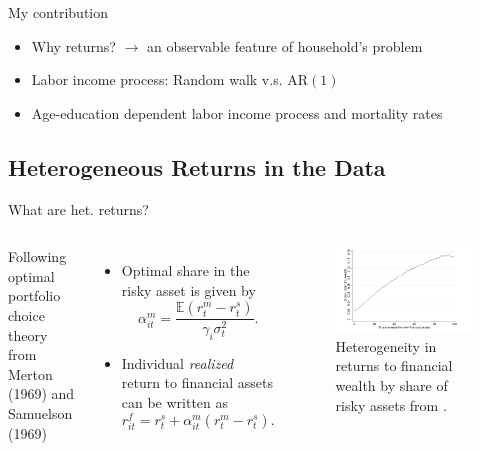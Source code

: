 \documentclass{beamer}
\begin{document}
\begin{frame}{My contribution}


\begin{itemize}
  \item Why returns? $\rightarrow$ an observable feature of household's problem
\item Labor income process: Random walk v.s. AR$(1)$
\item Age-education dependent labor income process and mortality rates
\end{itemize}
\end{frame}

\subsection{Heterogeneous Returns in the Data}
\begin{frame}{What are het. returns?}

   \begin{columns}
     \small
     Following optimal portfolio choice theory from Merton (1969) and Samuelson (1969)
    \centering

    \begin{itemize}
    \item Optimal share in the risky asset is given by
    $$ \alpha_{it}^{m} = \frac{\mathbb{E}(r_{t}^{m} - r_{t}^{s})}{\gamma_i \sigma^{2}_{t}}.$$
    \item Individual \textit{realized} return to financial assets can be written as
    $$ r_{it}^{f} = r_{t}^{s} + \alpha_{it}^{m} (r_{t}^{m} - r_{t}^{s}). $$
    \end{itemize}

    \centering
    \begin{figure}
    \includegraphics[width=\textwidth]{Figures/Fagereng2020Fig1.png}
    \captionsetup{font=scriptsize}
    \caption{Heterogeneity in returns to financial wealth by share of risky assets from \cite{aflgdmlp20}.}
    \end{figure}
  \end{columns}

\end{frame}
\end{document}

